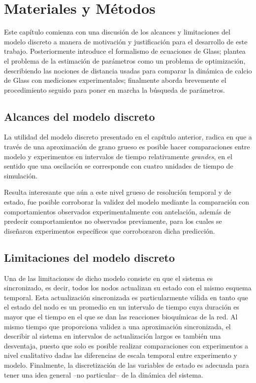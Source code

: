 \chapter{Materiales y M\'etodos}\label{ch:matmet} %
Este capítulo comienza con una discusión de los alcances y limitaciones del modelo discreto a manera de motivación y justificación para el desarrollo de este trabajo. Posteriormente introduce el formalismo de ecuaciones de Glass; plantea el problema de la estimación de parámetros como un problema de optimización, describiendo las nociones de distancia usadas para comparar la dinámica de calcio de Glass con mediciones experimentales; finalmente aborda brevemente el procedimiento seguido para poner en marcha la búsqueda de parámetros.

\section{Alcances del modelo discreto}

La utilidad del modelo discreto presentado en el capítulo anterior, radica en que a través de una aproximación de grano grueso es posible hacer comparaciones entre modelo y experimentos en intervalos de tiempo relativamente \emph{grandes}, en el sentido que una oscilación se corresponde con cuatro unidades de tiempo de simulación. 

Resulta interesante que aún a este nivel grueso de resolución temporal y de estado, fue posible corroborar la validez del modelo mediante la comparación con comportamientos observados experimentalmente con antelación, además de predecir comportamientos no observados previamente, para los cuales se diseñaron experimentos específicos que corroboraron dicha predicción.

\section{Limitaciones del modelo discreto}

Una de las limitaciones de dicho modelo consiste en que el sistema es sincronizado, es decir, todos los nodos actualizan su estado con el mismo esquema temporal. Esta actualización sincronizada es particularmente válida en tanto que el estado del nodo es un promedio en un intervalo de tiempo cuya duración es mayor que el tiempo en el que se dan las reacciones bioquímicas de la red. Al mismo tiempo que proporciona validez a una aproximación sincronizada, el describir al sistema en intervalos de actualización largos es también una desventaja, puesto que solo es posible realizar comparaciones con experimentos a nivel cualitativo dadas las diferencias de escala temporal entre experimento y modelo. Finalmente, la discretización de las variables de estado es adecuada para tener una idea general --no particular-- de la dinámica del sistema. 

